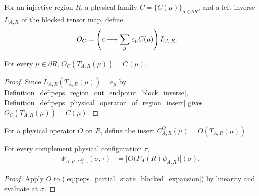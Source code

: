 \begin{definition}%
    \label{def:peps_physical_operator_of_region_insert}
    \leanok
    For an injective region $R$, a physical family
    $C=\{C(\mu)\}_{\mu\in\partial R}$, and a left inverse $L_{A,R}$ of the
    blocked tensor map, define
    \begin{align}
        O_C
         & =\left(c\longmapsto\sum_{\mu}c_\mu C(\mu)\right)L_{A,R}.
        \notag
    \end{align}
\end{definition}

\begin{lemma}%
    \label{thm:peps_physical_operator_of_region_insert_realizes}
    \leanok
    For every $\mu\in\partial R$, $O_C(T_{A,R}(\mu))=C(\mu)$.
\end{lemma}
\begin{proof}
    \leanok
    Since $L_{A,R}(T_{A,R}(\mu))=e_\mu$ by
    Definition~\ref{def:peps_region_out_endpoint_block_inverse},
    Definition~\ref{def:peps_physical_operator_of_region_insert} gives
    $O_C(T_{A,R}(\mu))=C(\mu)$.
\end{proof}

\begin{definition}%
    \label{def:peps_region_insert_of_physical_operator}
    \leanok
    For a physical operator $O$ on $R$, define the insert
    $C^O_{A,R}(\mu)=O(T_{A,R}(\mu))$.
\end{definition}

\begin{lemma}%
    \label{thm:peps_closed_state_of_physical_operator}
    \leanok
    For every complement physical configuration $\tau$,
    \begin{align}
        \Psi_{A,R,C^O_{A,R}}(\sigma,\tau)
         & =\bigl[O\bigl(P_A(R)\psi^\tau_{A,R}\bigr)\bigr](\sigma).
        \label{eq:peps_physical_op_partial_state}
    \end{align}
\end{lemma}
\begin{proof}
    \leanok
    Apply $O$ to (\ref{eq:peps_partial_state_blocked_expansion}) by linearity
    and evaluate at $\sigma$.
\end{proof}

